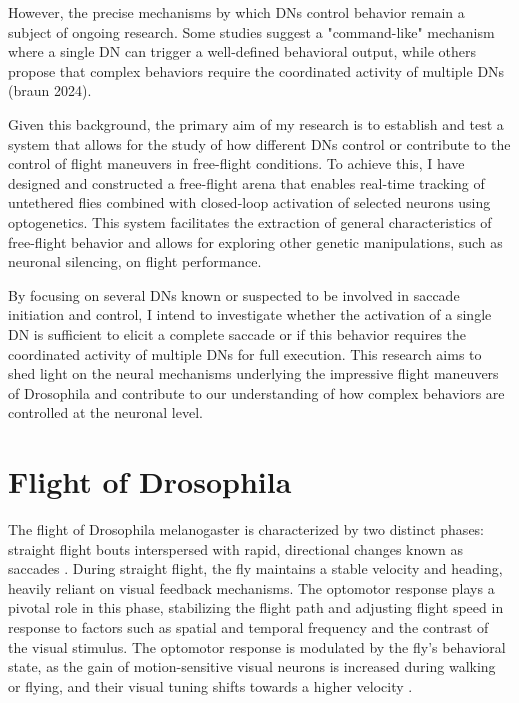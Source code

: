 \documentclass[../main/thesis_msc.tex]{subfiles}
\begin{document}
	
	However, the precise mechanisms by which DNs control behavior remain a subject of ongoing research. Some studies suggest a "command-like" mechanism where a single DN can trigger a well-defined behavioral output, while others propose that complex behaviors require the coordinated activity of multiple DNs \autocite{cande_optogenetic_2018, braun2024descending} (braun 2024).
	
	
	Given this background, the primary aim of my research is to establish and test a system that allows for the study of how different DNs control or contribute to the control of flight maneuvers in free-flight conditions. To achieve this, I have designed and constructed a free-flight arena that enables real-time tracking of untethered flies combined with closed-loop activation of selected neurons using optogenetics. This system facilitates the extraction of general characteristics of free-flight behavior and allows for exploring other genetic manipulations, such as neuronal silencing, on flight performance.
	
	
	By focusing on several DNs known or suspected to be involved in saccade initiation and control, I intend to investigate whether the activation of a single DN is sufficient to elicit a complete saccade or if this behavior requires the coordinated activity of multiple DNs for full execution. This research aims to shed light on the neural mechanisms underlying the impressive flight maneuvers of Drosophila and contribute to our understanding of how complex behaviors are controlled at the neuronal level.
	
	
	\section{Flight of Drosophila}
	
	The flight of Drosophila melanogaster is characterized by two distinct phases: straight flight bouts interspersed with rapid, directional changes known as saccades \autocite{collett_visual_1975}. During straight flight, the fly maintains a stable velocity and heading, heavily reliant on visual feedback mechanisms. The optomotor response plays a pivotal role in this phase, stabilizing the flight path and adjusting flight speed in response to factors such as spatial and temporal frequency and the contrast of the visual stimulus. The optomotor response is modulated by the fly’s behavioral state, as the gain of motion-sensitive visual neurons is increased during walking or flying, and their visual tuning shifts towards a higher velocity \autocite{borst_fly_2010,jung_flight_2011,cellini2020hybrid}.
	
\end{document}
